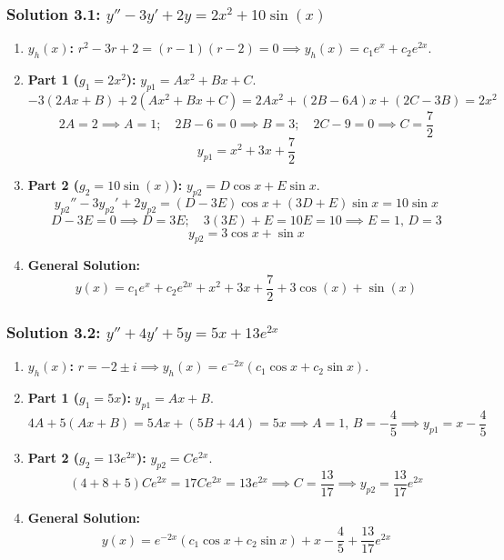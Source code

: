 \documentclass[11pt,letterpaper]{article}
\begin{document}
\subsubsection*{Solution 3.1: $y'' - 3y' + 2y = 2x^2 + 10\sin(x)$}
\begin{enumerate}
    \item \textbf{$y_h(x)$:} $r^2 - 3r + 2 = (r-1)(r-2) = 0 \implies y_h(x) = c_1 e^x + c_2 e^{2x}$.
    \item \textbf{Part 1 ($g_1 = 2x^2$):} $y_{p1} = A x^2 + B x + C$.
    \[ -3(2Ax+B) + 2(Ax^2+Bx+C) = 2A x^2 + (2B - 6A)x + (2C - 3B) = 2x^2 \]
    \[ 2A = 2 \implies A = 1; \quad 2B - 6 = 0 \implies B = 3; \quad 2C - 9 = 0 \implies C = \frac{7}{2} \]
    \[ y_{p1} = x^2 + 3x + \frac{7}{2} \]
    \item \textbf{Part 2 ($g_2 = 10\sin(x)$):} $y_{p2} = D \cos x + E \sin x$.
    \[ y_{p2}'' - 3y_{p2}' + 2y_{p2} = (D - 3E)\cos x + (3D + E)\sin x = 10\sin x \]
    \[ D - 3E = 0 \implies D = 3E; \quad 3(3E) + E = 10E = 10 \implies E = 1, \, D = 3 \]
    \[ y_{p2} = 3\cos x + \sin x \]
    \item \textbf{General Solution:}
    \[ y(x) = c_1 e^x + c_2 e^{2x} + x^2 + 3x + \frac{7}{2} + 3\cos(x) + \sin(x) \]
\end{enumerate}

\subsubsection*{Solution 3.2: $y'' + 4y' + 5y = 5x + 13e^{2x}$}
\begin{enumerate}
    \item \textbf{$y_h(x)$:} $r = -2 \pm i \implies y_h(x) = e^{-2x}(c_1 \cos x + c_2 \sin x)$.
    \item \textbf{Part 1 ($g_1 = 5x$):} $y_{p1} = Ax + B$.
    \[ 4A + 5(Ax+B) = 5Ax + (5B + 4A) = 5x \implies A = 1, \, B = -\frac{4}{5} \implies y_{p1} = x - \frac{4}{5} \]
    \item \textbf{Part 2 ($g_2 = 13e^{2x}$):} $y_{p2} = C e^{2x}$.
    \[ (4 + 8 + 5) C e^{2x} = 17 C e^{2x} = 13 e^{2x} \implies C = \frac{13}{17} \implies y_{p2} = \frac{13}{17} e^{2x} \]
    \item \textbf{General Solution:}
    \[ y(x) = e^{-2x}(c_1 \cos x + c_2 \sin x) + x - \frac{4}{5} + \frac{13}{17} e^{2x} \]
\end{enumerate}
\end{document}
